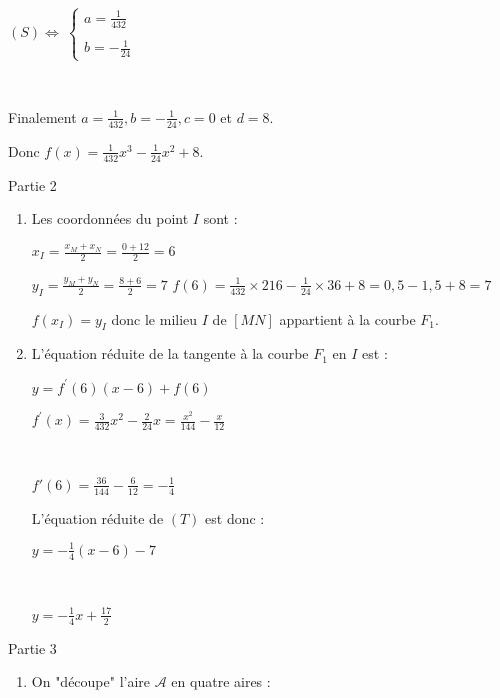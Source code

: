 \begin{corrige}
\begin{enumerate}
     $(S) \Leftrightarrow \ \begin{cases} a=\frac{1}{432} \\ \\ b=-\frac{1}{24}   \end{cases}$ ~
     \par
     ~
     \par
     Finalement $ a=\frac{1}{432},  b=-\frac{1}{24}, c=0  $ et $d=8$.
     \par
     Donc $f(x)=\frac{1}{432}x^3-\frac{1}{24}x^2+8$.
\end{enumerate}
\begin{h3}Partie 2\end{h3}
\begin{enumerate}
     \item
     Les coordonnées du point $I$ sont :
     \par
     $x_I=\frac{x_M+x_N}{2}=\frac{0+12}{2}=6$
     \par
     $y_I=\frac{y_M+y_N}{2}=\frac{8+6}{2}=7$
$f(6)=\frac{1}{432} \times 216-\frac{1}{24} \times 36+8$$=0,5-1,5+8=7$
\par
$f(x_I)=y_I$ donc le milieu $I$ de $[MN]$ appartient à la courbe $F_1$.
\item
L'équation réduite de la tangente à la courbe $F_1$ en $I$ est :
\par
$y=f ^{\prime}(6)(x-6)+f(6)$
\par
$f ^{\prime}(x)=\frac{3}{432}x^2-\frac{2}{24}x$$=\frac{x^2}{144}-\frac{x}{12}$
\par
~
\par
$f'(6)=\frac{36}{144}-\frac{6}{12}=-\frac{1}{4}$
\par
L'équation réduite de $(T)$ est donc :
\par
$y=-\frac{1}{4}(x-6)-7$
\par
~
\par
$y=-\frac{1}{4}x+\frac{17}{2}$
\begin{center}
\end{center}   
\end{enumerate}
\begin{h3}Partie 3\end{h3}
\begin{enumerate}
     \item
     On "découpe" l'aire $\mathscr A$ en quatre aires :

\end{enumerate}
\end{corrige}
